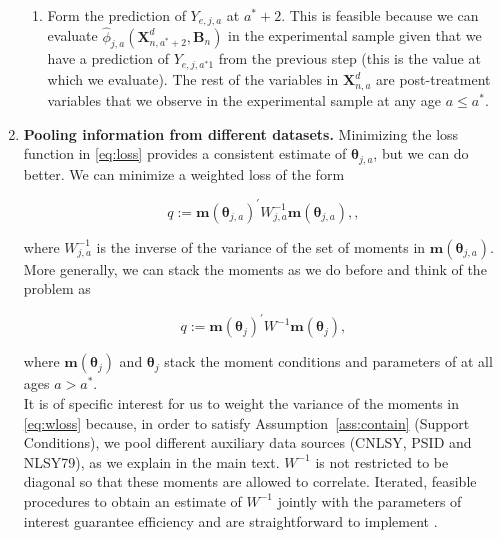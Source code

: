 \begin{enumerate}
\begin{enumerate}
\item Form the prediction of $Y_{e,j,a}$ at $a^* + 2$. This is feasible because we can evaluate $ \hat{\phi}_{j,a}\left( \bm{X}_{n,a^*+2}^d, \bm{B}_{n} \right)$ in the experimental sample given that we have a prediction of $Y_{e,j,a^*1}$ from the previous step (this is the value at which we evaluate). The rest of the variables in $\bm{X}_{n,a}^d$ are post-treatment variables that we observe in the experimental sample at any age $a \leq a^*$.
\end{enumerate}

\item \textbf{Pooling information from different datasets.} Minimizing the loss function in \eqref{eq:loss} provides a consistent estimate of $\bm{\theta}_{j,a}$, but we can do better. We can minimize a weighted loss of the form 

\begin{equation}
q :=  {\bm{m} \left( \bm{\theta}_{j,a} \right)}^{'} W_{j,a}^{-1} {\bm{m} \left( \bm{\theta}_{j,a} \right)}, \label{eq:wloss},
\end{equation}

\noindent where $W_{j,a}^{-1}$ is the inverse of the variance of the set of moments in $\bm{m} \left( \bm{\theta}_{j,a} \right)$. More generally, we can stack the moments as we do before and think of the problem as 

\begin{equation}
q :=  {\bm{m} \left( \bm{\theta}_{j} \right)}^{'} W ^{-1} {\bm{m} \left( \bm{\theta}_{j}\right)}, \label{eq:wloss}
\end{equation}

\noindent where $\bm{m} \left( \bm{\theta}_{j} \right)$ and  $\bm{\theta}_{j}$  stack the moment conditions and parameters of at all ages $a > a^*$.\\

\noindent It is of specific interest for us to weight the variance of the moments in \eqref{eq:wloss} because, in order to satisfy Assumption~\ref{ass:contain} (Support Conditions), we pool different auxiliary data sources (CNLSY, PSID and NLSY79), as we explain in the main text. $W ^{-1} $ is not restricted to be diagonal so that these moments are allowed to correlate. Iterated, feasible procedures to obtain an estimate of $W ^{-1}$ jointly with the parameters of interest guarantee efficiency and are straightforward to implement \citep{Hansen_1982_Econometrica,Amemiya_1985_advanced}.


\end{enumerate}
